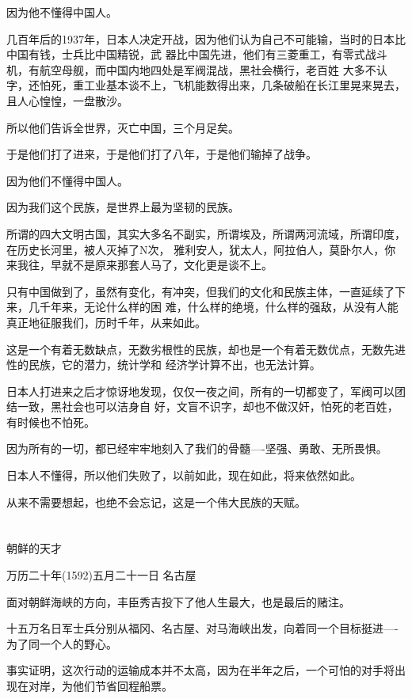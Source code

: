 \documentclass[11pt,a4paper,onecolumn]{article}
\begin{document}
因为他不懂得中国人。

几百年后的1937年，日本人决定开战，因为他们认为自己不可能输，当时的日本比中国有钱，士兵比中国精锐，武
器比中国先进，他们有三菱重工，有零式战斗机，有航空母舰，而中国内地四处是军阀混战，黑社会横行，老百姓
大多不认字，还怕死，重工业基本谈不上，飞机能数得出来，几条破船在长江里晃来晃去，且人心惶惶，一盘散沙。

所以他们告诉全世界，灭亡中国，三个月足矣。

于是他们打了进来，于是他们打了八年，于是他们输掉了战争。

因为他们不懂得中国人。

因为我们这个民族，是世界上最为坚韧的民族。

所谓的四大文明古国，其实大多名不副实，所谓埃及，所谓两河流域，所谓印度，在历史长河里，被人灭掉了N次，
雅利安人，犹太人，阿拉伯人，莫卧尔人，你来我往，早就不是原来那套人马了，文化更是谈不上。

只有中国做到了，虽然有变化，有冲突，但我们的文化和民族主体，一直延续了下来，几千年来，无论什么样的困
难，什么样的绝境，什么样的强敌，从没有人能真正地征服我们，历时千年，从来如此。

这是一个有着无数缺点，无数劣根性的民族，却也是一个有着无数优点，无数先进性的民族，它的潜力，统计学和
经济学计算不出，也无法计算。

日本人打进来之后才惊讶地发现，仅仅一夜之间，所有的一切都变了，军阀可以团结一致，黑社会也可以洁身自
好，文盲不识字，却也不做汉奸，怕死的老百姓，有时候也不怕死。

因为所有的一切，都已经牢牢地刻入了我们的骨髓----坚强、勇敢、无所畏惧。

日本人不懂得，所以他们失败了，以前如此，现在如此，将来依然如此。

从来不需要想起，也绝不会忘记，这是一个伟大民族的天赋。

\section[\thesection]{}

朝鲜的天才

万历二十年(1592)五月二十一日 名古屋

面对朝鲜海峡的方向，丰臣秀吉投下了他人生最大，也是最后的赌注。

十五万名日军士兵分别从福冈、名古屋、对马海峡出发，向着同一个目标挺进----为了同一个人的野心。

事实证明，这次行动的运输成本并不太高，因为在半年之后，一个可怕的对手将出现在对岸，为他们节省回程船票。
\end{document}
